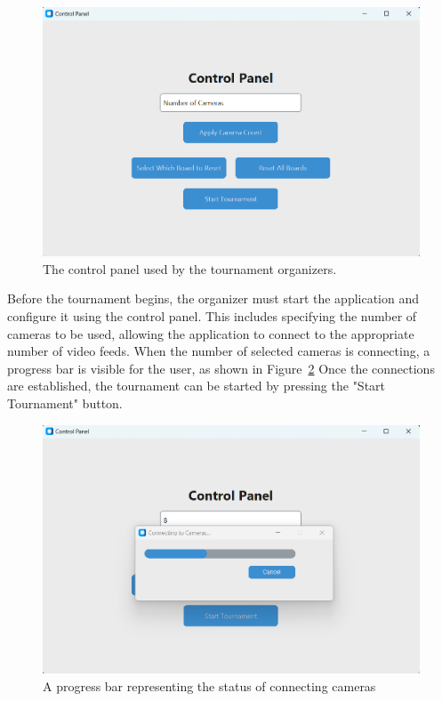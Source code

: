 \begin{figure}[h!] \centering \includegraphics[width=0.75\linewidth]{figures/results/frontend/control-panel/control-panel.png} \caption[Control panel for tournament organizers]{The control panel used by the tournament organizers.}\label{fig:control-panel} \end{figure}

Before the tournament begins, the organizer must start the application and configure it using the control panel. This includes specifying the number of cameras to be used, allowing the application to connect to the appropriate number of video feeds. When the number of selected cameras is connecting, a progress bar is visible for the user, as shown in Figure~\ref{fig:control-panel-camera} Once the connections are established, the tournament can be started by pressing the "Start Tournament" button. \\
 
\begin{figure}[h!] \centering \includegraphics[width=0.75\linewidth]{figures/results/frontend/control-panel/camera-progress.png} \caption[Progress bar for camera connections]{A progress bar representing the status of connecting cameras}\label{fig:control-panel-camera} \end{figure}

